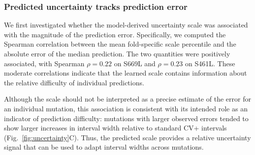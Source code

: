 \documentclass[11pt]{article}
\begin{document}



\subsubsection{Predicted uncertainty tracks prediction error}

We first investigated whether the model-derived uncertainty scale was associated with the magnitude of the prediction error. Specifically, we computed the Spearman correlation between the mean fold-specific scale percentile and the absolute error of the median prediction. The two quantities were positively associated, with Spearman $\rho=0.22$ on S669L and $\rho=0.23$ on S461L. These moderate correlations indicate that the learned scale contains information about the relative difficulty of individual predictions. 

Although the scale should not be interpreted as a precise estimate of the error for an individual mutation, this association is consistent with its intended role as an indicator of prediction difficulty: mutations with larger observed errors tended to show larger increases in interval width relative to standard CV+ intervals (Fig.~\ref{fig:uncertainty}C). Thus, the predicted scale provides a relative uncertainty signal that can be used to adapt interval widths across mutations.

\end{document}
